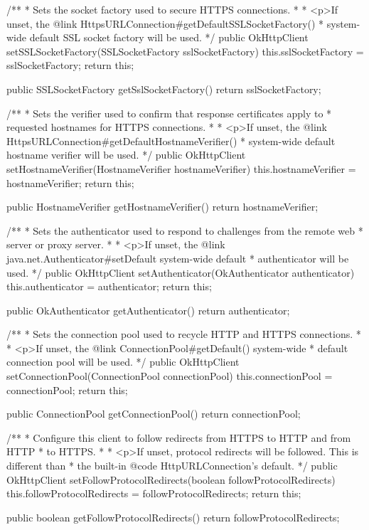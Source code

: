 \begin{prompt}
{{{{{{{{  /**
   * Sets the socket factory used to secure HTTPS connections.
   *
   * <p>If unset, the {@link HttpsURLConnection#getDefaultSSLSocketFactory()
   * system-wide default} SSL socket factory will be used.
   */
  public OkHttpClient setSSLSocketFactory(SSLSocketFactory sslSocketFactory) {
    this.sslSocketFactory = sslSocketFactory;
    return this;
  }

  public SSLSocketFactory getSslSocketFactory() {
    return sslSocketFactory;
  }

  /**
   * Sets the verifier used to confirm that response certificates apply to
   * requested hostnames for HTTPS connections.
   *
   * <p>If unset, the {@link HttpsURLConnection#getDefaultHostnameVerifier()
   * system-wide default} hostname verifier will be used.
   */
  public OkHttpClient setHostnameVerifier(HostnameVerifier hostnameVerifier) {
    this.hostnameVerifier = hostnameVerifier;
    return this;
  }

  public HostnameVerifier getHostnameVerifier() {
    return hostnameVerifier;
  }

  /**
   * Sets the authenticator used to respond to challenges from the remote web
   * server or proxy server.
   *
   * <p>If unset, the {@link java.net.Authenticator#setDefault system-wide default}
   * authenticator will be used.
   */
  public OkHttpClient setAuthenticator(OkAuthenticator authenticator) {
    this.authenticator = authenticator;
    return this;
  }

  public OkAuthenticator getAuthenticator() {
    return authenticator;
  }

  /**
   * Sets the connection pool used to recycle HTTP and HTTPS connections.
   *
   * <p>If unset, the {@link ConnectionPool#getDefault() system-wide
   * default} connection pool will be used.
   */
  public OkHttpClient setConnectionPool(ConnectionPool connectionPool) {
    this.connectionPool = connectionPool;
    return this;
  }

  public ConnectionPool getConnectionPool() {
    return connectionPool;
  }

  /**
   * Configure this client to follow redirects from HTTPS to HTTP and from HTTP
   * to HTTPS.
   *
   * <p>If unset, protocol redirects will be followed. This is different than
   * the built-in {@code HttpURLConnection}'s default.
   */
  public OkHttpClient setFollowProtocolRedirects(boolean followProtocolRedirects) {
    this.followProtocolRedirects = followProtocolRedirects;
    return this;
  }

  public boolean getFollowProtocolRedirects() {
    return followProtocolRedirects;
  }

}}}}}}}}
\end{prompt}
